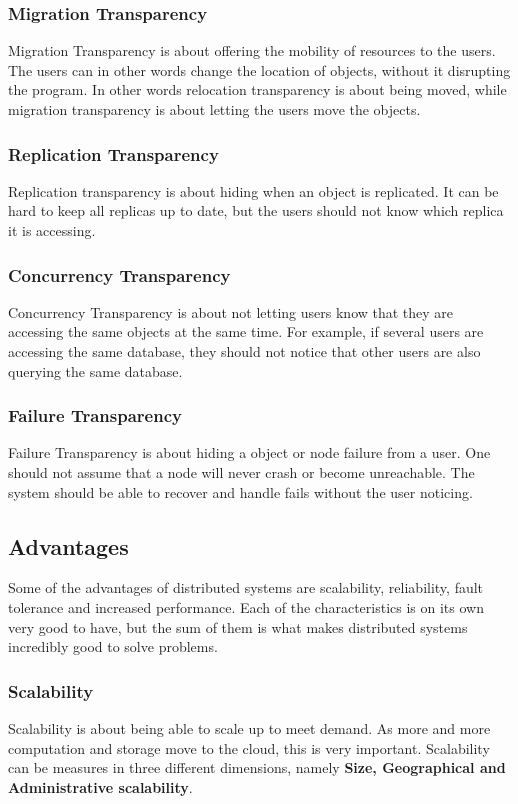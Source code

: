 \subsubsection{Migration Transparency}
Migration Transparency is about offering the mobility of resources to the users. The users can in other words change the location of objects, without it disrupting the program. In other words relocation transparency is about being moved, while migration transparency is about letting the users move the objects.

\subsubsection{Replication Transparency}
Replication transparency is about hiding when an object is replicated. It can be hard to keep all replicas up to date, but the users should not know which replica it is accessing.

\subsubsection{Concurrency Transparency}
Concurrency Transparency is about not letting users know that they are accessing the same objects at the same time. For example, if several users are accessing the same database, they should not notice that other users are also querying the same database.

\subsubsection{Failure Transparency}
Failure Transparency is about hiding a object or node failure from a user. One should not assume that a node will  never crash or become unreachable. The system should be able to recover and handle fails without the user noticing.


\subsection{Advantages}
Some of the advantages of distributed systems are scalability, reliability, fault tolerance and increased performance. Each of the characteristics is on its own very good to have, but the sum of them is what makes distributed systems incredibly good to solve problems. %

\subsubsection{Scalability}
Scalability is about being able to scale up to meet demand. As more and more computation and storage move to the cloud, this is very important. Scalability can be measures in three different dimensions, namely \textbf{Size, Geographical and Administrative scalability}.

